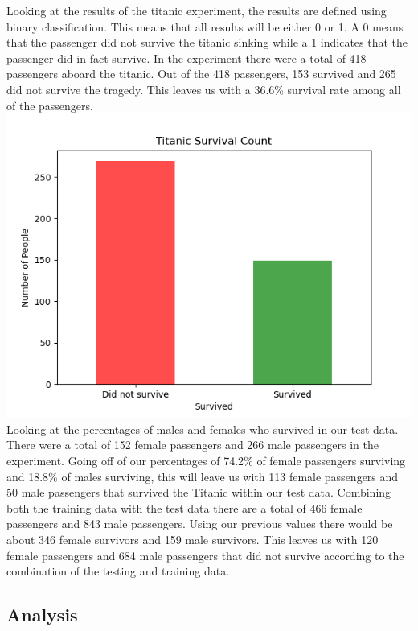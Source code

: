 \documentclass{IEEE}
\begin{document}
Looking at the results of the titanic experiment, the results are defined using binary classification. This means that all results will be either 0 or 1. A 0 means that the passenger did not survive the titanic sinking while a 1 indicates that the passenger did in fact survive. In the experiment there were a total of 418 passengers aboard the titanic. Out of the 418 passengers, 153 survived and 265 did not survive the tragedy. This leaves us with a 36.6\% survival rate among all of the passengers.
\includegraphics[scale=0.34]{./barchart2}
Looking at the percentages of males and females who survived in our test data. There were a total of 152 female passengers and 266 male passengers in the experiment. Going off of our percentages of 74.2\% of female passengers surviving and 18.8\% of males surviving, this will leave us with 113 female passengers and 50 male passengers that survived the Titanic within our test data. Combining both the training data with the test data there are a total of 466 female passengers and 843 male passengers. Using our previous values there would be about 346 female survivors and 159 male survivors. This leaves us with 120 female passengers and 684 male passengers that did not survive according to the combination of the testing and training data.

\subsection{Analysis}
\end{document}
